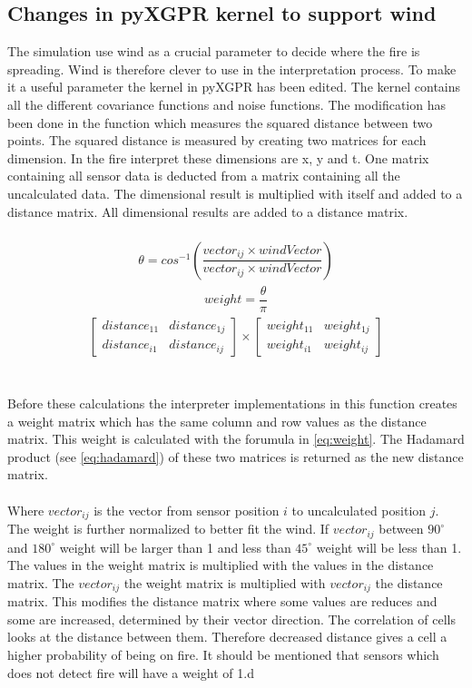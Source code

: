 \subsection{Changes in pyXGPR kernel to support wind}
The simulation use wind as a crucial parameter to decide where the fire is spreading. Wind is therefore clever to use in the interpretation process. To make it a useful parameter the kernel in pyXGPR has been edited. The kernel contains all the different covariance functions and noise functions. The modification has been done in the function which measures the squared distance between two points. The squared distance is measured by creating two matrices for each dimension. In the fire interpret these dimensions are x, y and t. One matrix containing all sensor data is deducted from a matrix containing all the uncalculated data. The dimensional result is multiplied with itself and added to a distance matrix. All dimensional results are added to a distance matrix. 
\\\\
\begin{eqnarray}
\theta = cos^{-1}\left(\dfrac{vector_{ij} \times windVector}{vector_{ij} \times windVector } \right) 
\label{eq:int-angle}
\end{eqnarray}
\begin{eqnarray}
weight = \dfrac{\theta}{\pi}
\label{eq:weight}
\end{eqnarray}
\begin{eqnarray}
\begin{bmatrix} distance_{11} & distance_{1j} \\ distance_{i1} & distance_{ij} \end{bmatrix} \times 
\begin{bmatrix} weight_{11} & weight_{1j} \\ weight_{i1} & weight_{ij} \end{bmatrix}
\label{eq:hadamard}
\end{eqnarray}
\\\\
Before these calculations the interpreter implementations in this function creates a weight matrix which has the same column and row values as the distance matrix. This weight is calculated with the forumula in \ref{eq:weight}. The Hadamard product (see \ref{eq:hadamard}) of these two matrices is returned as the new distance matrix. 
\\\\
Where $ vector_{ij} $ is the vector from sensor position $i$ to uncalculated position $j$. The weight is further normalized to better fit the wind. If $ vector_{ij} $ between $ 90^{\circ} $ and $ 180^{\circ} $ weight will be larger than 1 and less than $ 45^{\circ} $ weight will be less than 1. The values in the weight matrix is multiplied with the values in the distance matrix. The $ vector_{ij} $ the weight matrix is multiplied with $ vector_{ij} $ the distance matrix. This modifies the distance matrix where some values are reduces and some are increased, determined by their vector direction. The correlation of cells looks at the distance between them. Therefore decreased distance gives a cell a higher probability of being on fire. It should be mentioned that sensors which does not detect fire will have a weight of 1.d
